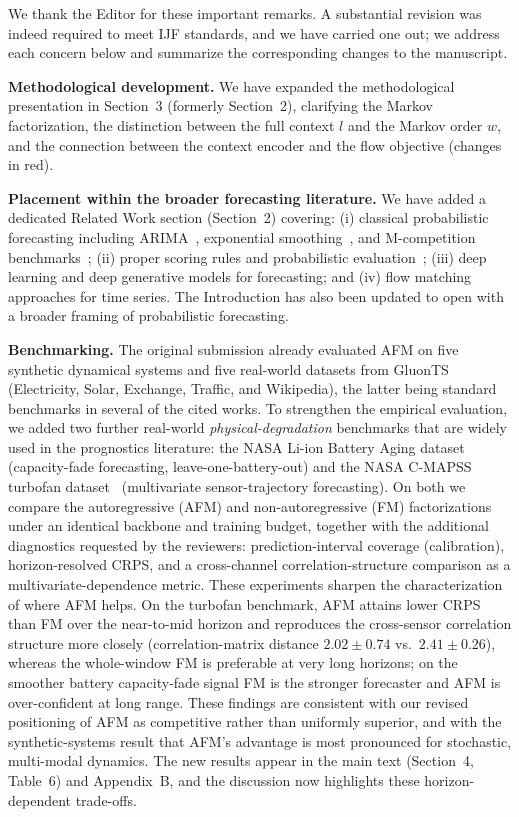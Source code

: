 \documentclass[11pt]{article}
\newcommand{\authorresponse}[1]{%
    #1\par\medskip
}
\begin{document}
\authorresponse{%
We thank the Editor for these important remarks. A substantial revision was indeed required to meet IJF standards, and we have carried one out; we address each concern below and summarize the corresponding changes to the manuscript.

\textbf{Methodological development.} We have expanded the methodological presentation in Section~3 (formerly Section~2), clarifying the Markov factorization, the distinction between the full context $l$ and the Markov order $w$, and the connection between the context encoder and the flow objective (changes in red).

\textbf{Placement within the broader forecasting literature.} We have added a dedicated Related Work section (Section~2) covering: (i) classical probabilistic forecasting including ARIMA~\cite{Box1994Timeseries}, exponential smoothing~\cite{hyndman2008forecasting}, and M-competition benchmarks~\cite{makridakis2020m4}; (ii) proper scoring rules and probabilistic evaluation~\cite{gneiting2007strictly,winkler1996scoring}; (iii) deep learning and deep generative models for forecasting; and (iv) flow matching approaches for time series. The Introduction has also been updated to open with a broader framing of probabilistic forecasting.

\textbf{Benchmarking.} The original submission already evaluated AFM on five synthetic dynamical systems and five real-world datasets from GluonTS~\cite{alexandrov2020gluonts} (Electricity, Solar, Exchange, Traffic, and Wikipedia), the latter being standard benchmarks in several of the cited works. To strengthen the empirical evaluation, we added two further real-world \emph{physical-degradation} benchmarks that are widely used in the prognostics literature: the NASA Li-ion Battery Aging dataset~\cite{saha2007battery} (capacity-fade forecasting, leave-one-battery-out) and the NASA C-MAPSS turbofan dataset~\cite{saxena2008cmapss} (multivariate sensor-trajectory forecasting). On both we compare the autoregressive (AFM) and non-autoregressive (FM) factorizations under an identical backbone and training budget, together with the additional diagnostics requested by the reviewers: prediction-interval coverage (calibration), horizon-resolved CRPS, and a cross-channel correlation-structure comparison as a multivariate-dependence metric. These experiments sharpen the characterization of where AFM helps. On the turbofan benchmark, AFM attains lower CRPS than FM over the near-to-mid horizon and reproduces the cross-sensor correlation structure more closely (correlation-matrix distance $2.02\!\pm\!0.74$ vs.\ $2.41\!\pm\!0.26$), whereas the whole-window FM is preferable at very long horizons; on the smoother battery capacity-fade signal FM is the stronger forecaster and AFM is over-confident at long range. These findings are consistent with our revised positioning of AFM as competitive rather than uniformly superior, and with the synthetic-systems result that AFM's advantage is most pronounced for stochastic, multi-modal dynamics. The new results appear in the main text (Section~4, Table~6) and Appendix~B, and the discussion now highlights these horizon-dependent trade-offs.
}
\end{document}
